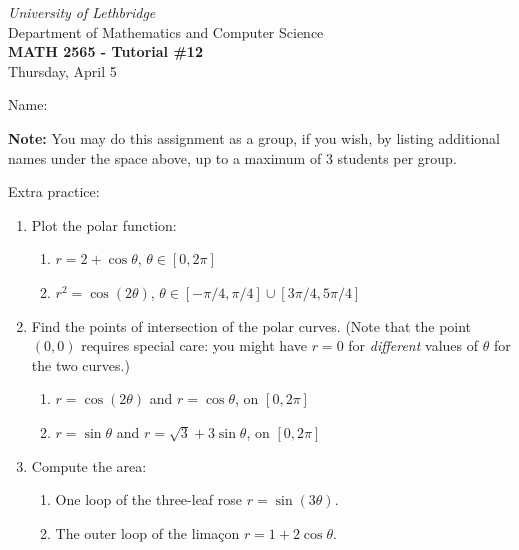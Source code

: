 \documentclass[12pt]{article}
\newcommand{\skipline}{\vspace{12pt}}
\begin{document}
\author{Instructor: Sean Fitzpatrick}
\thispagestyle{empty}
\begin{center}
\emph{University of Lethbridge}\\
Department of Mathematics and Computer Science\\
{\bf MATH 2565 - Tutorial \#12}\\
Thursday, April 5
\end{center}
\skipline \skipline \skipline \noindent \skipline

\skipline
Name:\underline{\hspace{348pt}}\\
\skipline

\vspace{2cm}

\textbf{Note:} You may do this assignment as a group, if you wish, by listing additional names under the space above, up to a maximum of 3 students per group.

\vspace*{\fill}

Extra practice:
\begin{enumerate}
\item Plot the polar function:
\begin{enumerate}
\item $r=2+\cos\theta$, $\theta\in [0,2\pi]$
\item $r^2=\cos(2\theta)$, $\theta\in [-\pi/4,\pi/4]\cup [3\pi/4,5\pi/4]$
\end{enumerate}
\item Find the points of intersection of the polar curves. (Note that the point $(0,0)$ requires special care: you might have $r=0$ for \textit{different} values of $\theta$ for the two curves.)
\begin{enumerate}
\item $r=\cos(2\theta)$ and $r=\cos\theta$, on $[0,2\pi]$
\item $r=\sin\theta$ and $r=\sqrt{3}+3\sin\theta$, on $[0,2\pi]$
\end{enumerate}
\item Compute the area:
\begin{enumerate}
\item One loop of the three-leaf rose $r=\sin(3\theta)$.
\item The outer loop of the lima{\c c}on $r=1+2\cos\theta$.
\end{enumerate}
\end{enumerate}


\newpage
\end{document}
